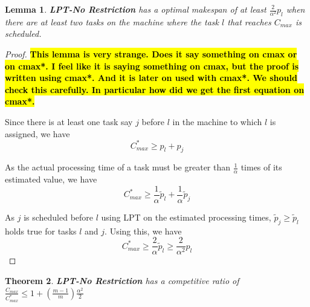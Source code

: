 \documentclass[10pt, conference, compsocconf]{IEEEtran}
\newtheorem{theorem}{Theorem}[section]
\newtheorem{lemma}[theorem]{Lemma}
\newcommand{\todo}[1]{{\color{red}\textbf{\hl{#1}}\xspace}}
\begin{document}
\begin{lemma}\label{No Restriction}
  \textbf{LPT-No Restriction} has a optimal makespan of at least $
  {\frac{2}{\alpha^{2}}} p_l $ when there are at least two tasks on
  the machine where the task $l$ that reaches $C_{max}$ is scheduled.
\end{lemma}
\begin{proof}
  \todo{This lemma is very strange. Does it say something on cmax or
    on cmax*. I feel like it is saying something on cmax, but the
    proof is written using cmax*. And it is later on used with
    cmax*. We should check this carefully. In particular how did we
    get the first equation on cmax*.}

  Since there is at least one task say $j$ before $l$ in the machine to which
  $l$ is assigned, we have
  \begin{equation}\nonumber
    C_{max}^{*}\geq p_l + p_j
  \end{equation}	

  As the actual processing time of a task must be greater than
  $\frac{1}{\alpha}$ times of its estimated value, we have
  \begin{equation}\nonumber 
    C_{max}^{*} \geq \frac{1}{\alpha}\tilde p_l +  \frac{1}{\alpha} \tilde p_j 
  \end{equation}

  As $j$ is scheduled before $l$ using LPT on the estimated processing
  times, $\tilde p_j\geq \tilde p_l$ holds true for tasks $l$ and $j$.
  Using this, we have
  \begin{equation}\nonumber
    C_{max}^{*} \geq \frac{2}{\alpha}\tilde p_l \geq {\frac{2}{\alpha^{2}}} p_l 
  \end{equation}
\end{proof}

\begin{theorem}
  \label{th:strategy2}
  \textbf{LPT-No Restriction} has a competitive ratio of
  $\frac{C_{max}}{C_{max}^{*}} \leq 1 + (\frac{m-1}{m})
  \frac{\alpha^{2}}{2}$
\end{theorem} 
\end{document}
